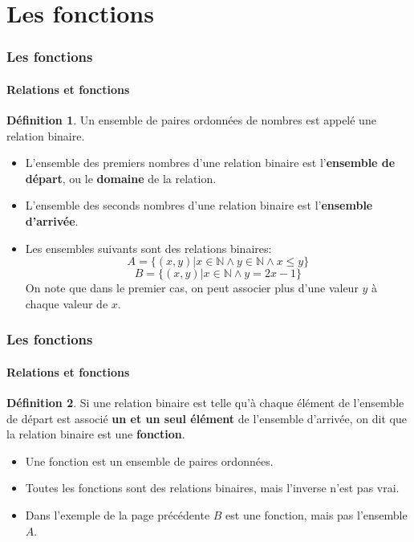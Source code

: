 \documentclass[10pt,notheorems]{beamer}
\theoremstyle{plain}
\theoremstyle{definition} %
\newtheorem{definition}{Définition}
\begin{document}
\section{Les fonctions}

\begin{frame}
  \frametitle{Les fonctions}
  \framesubtitle{Relations et fonctions}
  \hypertarget{slide_relations_et_fonctions_1}{}

  \begin{definition}\label{def:relation} Un ensemble de paires ordonnées de nombres est appelé une relation binaire.
  \end{definition}

  \begin{itemize}
  \item L'ensemble des premiers nombres d'une relation binaire est l'\textbf{ensemble de départ}, ou le \textbf{domaine} de la relation.\newline
  \item L'ensemble des seconds nombres d'une relation binaire est l'\textbf{ensemble d'arrivée}.\newline
  \item Les ensembles suivants sont des relations binaires:
    \[
      A = \{(x,y)| x\in\mathbb N \land y\in\mathbb N \land x\leq y\}
    \]
    \[
      B = \{(x,y)| x\in\mathbb N \land y = 2x-1\}
    \]
    On note que dans le premier cas, on peut associer plus d'une valeur $y$ à chaque valeur de $x$.
  \end{itemize}

\end{frame}


\begin{frame}
  \frametitle{Les fonctions}
  \framesubtitle{Relations et fonctions}
  \hypertarget{slide_relations_et_fonctions_2}{}

  \begin{definition}\label{def:fonction} Si une relation binaire est telle qu'à chaque élément de l'ensemble de départ est associé \textbf{un et un seul élément} de l'ensemble d'arrivée, on dit que la relation binaire est une \textbf{fonction}.
  \end{definition}

  \bigskip

  \begin{itemize}
  \item Une fonction est un ensemble de paires ordonnées.\newline
  \item Toutes les fonctions sont des relations binaires, mais l'inverse n'est pas vrai.\newline
  \item Dans l'exemple de la page précédente $B$ est une fonction, mais pas l'ensemble $A$.
  \end{itemize}

\end{frame}
\end{document}

